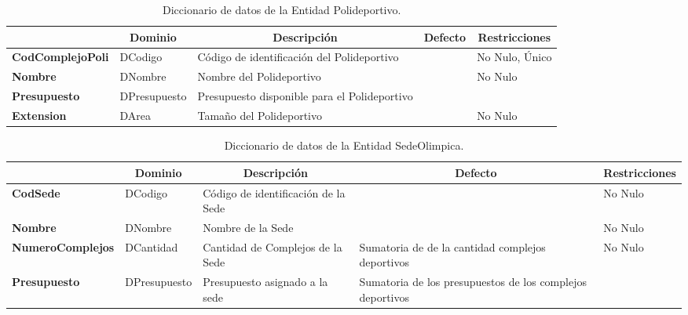 \begin{table}[H]
\centering
\caption{Diccionario de datos de la Entidad Polideportivo.}
\label{tab-Dicc-16}
\begin{tabular}{>{\bfseries}m{4.0cm}>{}m{3.0cm}>{}m{6.0cm}>{}m{5.0cm}>{}m{2.0cm}}
\toprule
\multicolumn{1}{c}{\textbf{Atributo}} & \multicolumn{1}{c}{\textbf{Dominio}} & \multicolumn{1}{c}{\textbf{Descripción}} & \multicolumn{1}{c}{\textbf{Defecto}} & \multicolumn{1}{c}{\textbf{Restricciones}} \\ \midrule
CodComplejoPoli	&	DCodigo	&	Código de identificación del Polideportivo	&		&	No Nulo, Único\\
Nombre	&	DNombre	&	Nombre del Polideportivo	&		&	No Nulo\\
Presupuesto	&	DPresupuesto	&	Presupuesto disponible para el Polideportivo	&		&	\\
Extension	&	DArea	&	Tamaño del Polideportivo	&		&	No Nulo\\\bottomrule
\end{tabular}
\end{table}

\begin{table}[H]
\centering
\caption{Diccionario de datos de la Entidad SedeOlimpica.}
\label{tab-Dicc-17}
\begin{tabular}{>{\bfseries}m{4.0cm}>{}m{3.0cm}>{}m{6.0cm}>{}m{5.0cm}>{}m{2.0cm}}
\toprule
\multicolumn{1}{c}{\textbf{Atributo}} & \multicolumn{1}{c}{\textbf{Dominio}} & \multicolumn{1}{c}{\textbf{Descripción}} & \multicolumn{1}{c}{\textbf{Defecto}} & \multicolumn{1}{c}{\textbf{Restricciones}} \\ \midrule
CodSede	&	DCodigo	&	Código de identificación de la Sede	&		&	No Nulo\\
Nombre	&	DNombre	&	Nombre de la Sede	&		&	No Nulo\\
NumeroComplejos	&	DCantidad	&	Cantidad de Complejos de la Sede	&	Sumatoria de de la cantidad complejos deportivos	&	No Nulo\\
Presupuesto	&	DPresupuesto	&	Presupuesto asignado a la sede	&	Sumatoria de los presupuestos de los complejos deportivos	&	\\\bottomrule
\end{tabular}
\end{table}

